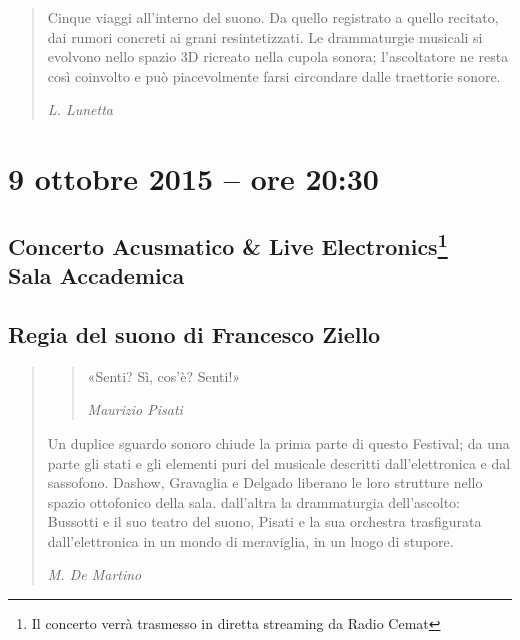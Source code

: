\documentclass[8pt, twoside, a5paper]{extreport}
\begin{document}
\begin{quote}

{\svolk \small
Cinque viaggi all'interno del suono.
Da quello registrato a quello recitato, dai rumori concreti ai grani resintetizzati.
Le drammaturgie musicali si evolvono nello spazio 3D ricreato nella cupola sonora; l'ascoltatore ne resta così coinvolto e può piacevolmente farsi circondare dalle traettorie sonore.}

\emph{L. Lunetta}
\end{quote} 


\begin{multicols}{2}




\end{multicols}

\clearpage

\section*{9 ottobre 2015 -- ore 20:30}

\subsection*{{\small Concerto Acusmatico \& Live Electronics\footnote{ Il concerto verrà trasmesso in diretta streaming da Radio Cemat}} \\
	\textsf{Sala Accademica}}

{\fontsize{30}{30} }

\subsection*{\textsf{Regia del suono di Francesco Ziello}}

\begin{quote}

{\svolk \small
\begin{quote}«Senti? Sì, cos’è? Senti!»

\hspace{1mm}\emph{Maurizio Pisati}
\end{quote}

Un duplice sguardo sonoro chiude la prima parte di questo Festival; da una parte gli stati e gli elementi puri del musicale descritti dall'elettronica  e dal sassofono. Dashow, Gravaglia e Delgado liberano le loro strutture nello spazio ottofonico della sala. dall'altra la drammaturgia dell'ascolto: Bussotti e il suo teatro del suono, Pisati e la  sua orchestra trasfigurata dall'elettronica in un mondo di meraviglia, in un luogo di stupore.}

\emph{M. De Martino}
\end{quote}    
\end{document}
